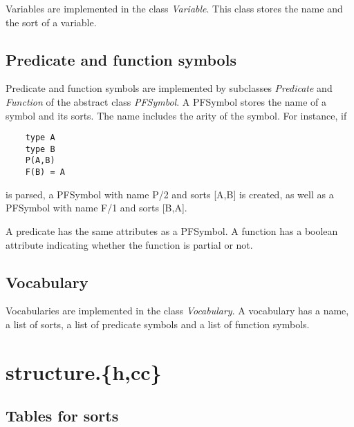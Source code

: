 \documentclass{article}
\begin{document}
Variables are implemented in the class \emph{Variable}. This class stores the name and the sort of a variable.

\subsection*{Predicate and function symbols}

Predicate and function symbols are implemented by subclasses \emph{Predicate} and \emph{Function} of the abstract class \emph{PFSymbol}. A PFSymbol stores the name of a symbol and its sorts. The name includes the arity of the symbol. For instance, if
\begin{lstlisting}
	type A
	type B
	P(A,B)
	F(B) = A
\end{lstlisting}
is parsed, a PFSymbol with name P/2 and sorts [A,B] is created, as well as a PFSymbol with name F/1 and sorts [B,A].

A predicate has the same attributes as a PFSymbol. A function has a boolean attribute indicating whether the function is partial or not.

\subsection*{Vocabulary}

Vocabularies are implemented in the class \emph{Vocabulary}. A vocabulary has a name, a list of sorts, a list of predicate symbols and a list of function symbols.

\section{structure.\{h,cc\}}

\subsection*{Tables for sorts}
\end{document}
